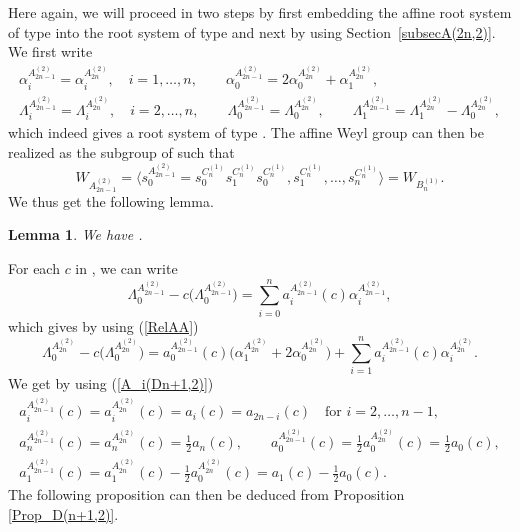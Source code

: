 \documentclass[pdftex]{sigma}
\newtheorem{Lemma}[Theorem]{Lemma}
\numberwithin{equation}{section}
\begin{document}
Here again, we will proceed in two steps by first embedding the affine root
system of type  into the root system of type 
and next by using Section~\ref{subsecA(2n,2)}. We first write%
\begin{gather}
\alpha _{i}^{A_{2n-1}^{(2)}}=\alpha _{i}^{A_{2n}^{(2)}},\quad i=1,\dots ,n, \qquad
\alpha _{0}^{A_{2n-1}^{(2)}}=2\alpha _{0}^{A_{2n}^{(2)}}+\alpha
_{1}^{A_{2n}^{(2)}},\nonumber\\
\Lambda _{i}^{A_{2n-1}^{(2)}}=\Lambda _{i}^{A_{2n}^{(2)}},\quad i=2,\dots ,n, \qquad
\Lambda _{0}^{A_{2n-1}^{(2)}}=\Lambda _{0}^{A_{2n}^{(2)}}, \qquad
\Lambda _{1}^{A_{2n-1}^{(2)}}=\Lambda _{1}^{A_{2n}^{(2)}}-\Lambda
_{0}^{A_{2n}^{(2)}},
 \label{RelAA}
\end{gather}
which indeed gives a root system of type . The affine Weyl
group  can then be realized as the subgroup of  such that
\begin{equation*}
W_{A_{2n-1}^{(2)}}=\bigl\langle
s_{0}^{A_{2n-1}^{(2)}}=s_{0}^{C_{n}^{(1)}}s_{1}^{C_{n}^{(1)}}s_{0}^{C_{n}^{(1)}},s_{1}^{C_{n}^{(1)}},\dots ,s_{n}^{C_{n}^{(1)}}\bigr\rangle =W_{B_{n}^{(1)}}.
\end{equation*}
We thus get the following lemma.

\begin{Lemma}
	We have .
\end{Lemma}

For each $c$ in , we can write%
\begin{equation*}
\Lambda _{0}^{A_{2n-1}^{(2)}}-c\bigl(\Lambda
_{0}^{A_{2n-1}^{(2)}}\bigr)=\sum_{i=0}^{n}a_{i}^{A_{2n-1}^{(2)}}(c)\alpha
_{i}^{A_{2n-1}^{(2)}},
\end{equation*}%
which gives by using (\ref{RelAA})%
\begin{equation*}
\Lambda _{0}^{A_{2n}^{(2)}}-c\bigl(\Lambda
_{0}^{A_{2n}^{(2)}}\bigr)=a_{0}^{A_{2n-1}^{(2)}}(c)\bigl(\alpha
_{1}^{A_{2n}^{(2)}}+2\alpha
_{0}^{A_{2n}^{(2)}}\bigr)+\sum_{i=1}^{n}a_{i}^{A_{2n-1}^{(2)}}(c)\alpha
_{i}^{A_{2n}^{(2)}} .
\end{equation*}%
We get by using (\ref{A_i(Dn+1,2)})
\begin{gather*}
a_{i}^{A_{2n-1}^{(2)}}(c)=a_{i}^{A_{2n}^{(2)}}(c)=a_{i}(c)=a_{2n-i}(c)\quad \text{for }i=2,\dots ,n-1 ,\\
a_{n}^{A_{2n-1}^{(2)}}(c)=a_{n}^{A_{2n}^{(2)}}(c)=\frac{1}{2}a_{n}(c) ,\qquad
a_{0}^{A_{2n-1}^{(2)}}(c)=\frac{1}{2}a_{0}^{A_{2n}^{(2)}}(c)=\frac{1}{2}
a_{0}(c),\\
a_{1}^{A_{2n-1}^{(2)}}(c)=a_{1}^{A_{2n}^{(2)}}(c)-\frac{1}{2}a_{0}^{A_{2n}^{(2)}}(c)=a_{1}(c)-\frac{1}{2}a_{0}(c).
\end{gather*}
The following proposition can then be deduced from Proposition \ref{Prop_D(n+1,2)}.
\end{document}
